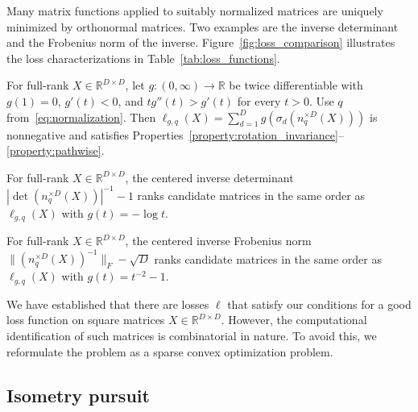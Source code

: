 Many matrix functions applied to suitably normalized matrices are uniquely minimized by orthonormal matrices.
Two examples are the inverse determinant and the Frobenius norm of the inverse.
Figure~\ref{fig:loss_comparison} illustrates the loss characterizations in Table~\ref{tab:loss_functions}.
\begin{proposition}
\label{prop:normalized_spectral_losses}
For full-rank $X\in\mathbb R^{D\times D}$, let $g:(0,\infty)\to\mathbb R$ be twice differentiable with $g(1)=0$, $g'(t)<0$, and $t g''(t)>g'(t)$ for every $t>0$.
Use $q$ from~\eqref{eq:normalization}.
Then $\ell_{g,q}(X)=\sum_{d=1}^D g\!\left(\sigma_d(n_q^{\times D}(X))\right)$ is nonnegative and satisfies Properties~\ref{property:rotation_invariance}--\ref{property:pathwise}.
\end{proposition}
\begin{proposition}
\label{prop:determinant_singular_values}
For full-rank $X\in\mathbb R^{D\times D}$, the centered inverse determinant $|\det(n_q^{\times D}(X))|^{-1}-1$ ranks candidate matrices in the same order as $\ell_{g,q}(X)$ with $g(t)=-\log t$.
\end{proposition}
\begin{proposition}
\label{prop:frobenius_inverse_singular_values}
For full-rank $X\in\mathbb R^{D\times D}$, the centered inverse Frobenius norm $\|(n_q^{\times D}(X))^{-1}\|_F-\sqrt D$ ranks candidate matrices in the same order as $\ell_{g,q}(X)$ with $g(t)=t^{-2}-1$.
\end{proposition}




We have established that there are losses $\ell$ that satisfy our conditions for a good loss function on square matrices $X \in \mathbb R^{D\times D}$.
However, the computational identification of such matrices is combinatorial in nature.
To avoid this, we reformulate the problem as a sparse convex optimization problem.


\subsection{Isometry pursuit}

